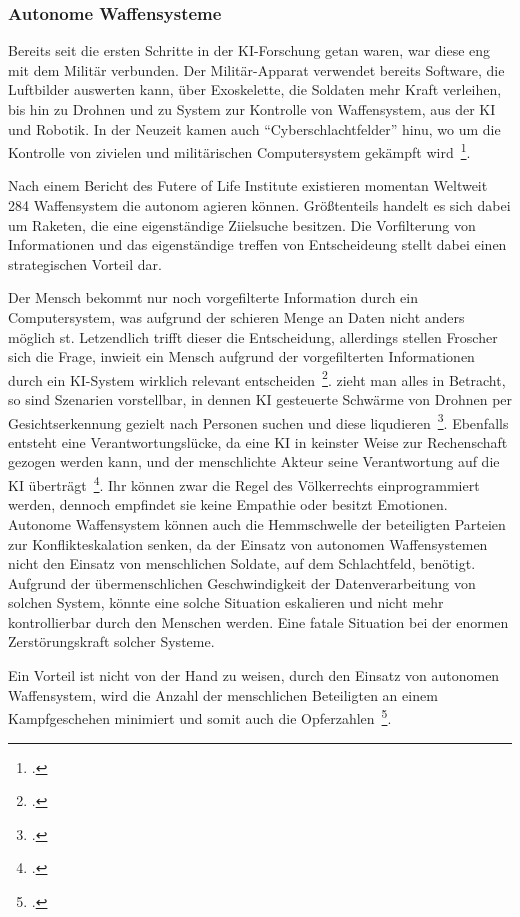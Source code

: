 \subsubsection{Autonome Waffensysteme}

Bereits seit die ersten Schritte in der \ac{KI}-Forschung getan waren, war diese eng mit dem Militär verbunden. Der Militär-Apparat verwendet bereits Software, die Luftbilder auswerten kann,
über Exoskelette, die Soldaten mehr Kraft verleihen, bis hin zu Drohnen und zu System zur Kontrolle von Waffensystem, aus der \ac{KI} und Robotik.
In der Neuzeit kamen auch \enquote{Cyberschlachtfelder} hinu, wo um die Kontrolle von zivielen und militärischen Computersystem gekämpft wird~\footcite[\vglf][]{Lenzen.2020}.

Nach einem Bericht des Futere of Life Institute existieren momentan Weltweit 284 Waffensystem die autonom agieren können. Größtenteils handelt es sich dabei um Raketen,
die eine eigenständige Ziielsuche besitzen. Die Vorfilterung von Informationen und das eigenständige treffen von Entscheideung stellt dabei einen strategischen Vorteil dar. 

Der Mensch bekommt nur noch vorgefilterte Information durch ein Computersystem, was aufgrund der schieren Menge an Daten nicht anders möglich st. Letzendlich trifft dieser
die Entscheidung, allerdings stellen Froscher sich die Frage, inwieit ein Mensch aufgrund der vorgefilterten Informationen durch ein \ac{KI}-System wirklich relevant entscheiden~\footcite[\vglf][]{Lenzen.2020}.
zieht man alles in Betracht, so sind Szenarien vorstellbar, in dennen \ac{KI} gesteuerte Schwärme von Drohnen per Gesichtserkennung gezielt nach Personen suchen und diese liqudieren~\footcite[\vglf][]{Kipper.2020}.
Ebenfalls entsteht eine Verantwortungslücke, da eine \ac{KI} in keinster Weise zur Rechenschaft gezogen werden kann, und der menschlichte Akteur seine Verantwortung auf die 
\ac{KI} überträgt~\footcite[\vglf][]{Heinrichs.2022}.
Ihr können zwar die Regel des Völkerrechts einprogrammiert werden, dennoch empfindet sie keine Empathie oder besitzt Emotionen.
Autonome Waffensystem können auch die Hemmschwelle der beteiligten Parteien zur Konflikteskalation senken, da der Einsatz von autonomen Waffensystemen nicht den Einsatz 
von menschlichen Soldate, auf dem Schlachtfeld, benötigt.
Aufgrund der übermenschlichen Geschwindigkeit der Datenverarbeitung von solchen System, könnte eine solche Situation eskalieren und nicht mehr kontrollierbar durch den Menschen werden.
Eine fatale Situation bei der enormen Zerstörungskraft solcher Systeme.

Ein Vorteil ist nicht von der Hand zu weisen, durch den Einsatz von autonomen Waffensystem, wird die Anzahl der menschlichen Beteiligten an einem Kampfgeschehen minimiert und 
somit auch die Opferzahlen~\footcite[\vglf][]{Kipper.2020}.